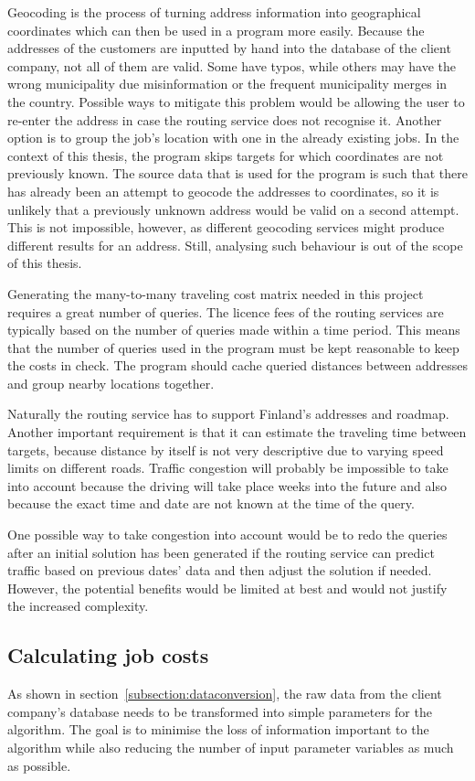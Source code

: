 Geocoding is the process of turning address information into geographical coordinates which can then be used in a program more easily. Because the addresses of the customers are inputted by hand into the database of the client company, not all of them are valid. Some have typos, while others may have the wrong municipality due misinformation or the frequent municipality merges in the country. Possible ways to mitigate this problem would be allowing the user to re-enter the address in case the routing service does not recognise it. Another option is to group the job's location with one in the already existing jobs. In the context of this thesis, the program skips targets for which coordinates are not previously known. The source data that is used for the program is such that there has already been an attempt to geocode the addresses to coordinates, so it is unlikely that a previously unknown address would be valid on a second attempt. This is not impossible, however, as different geocoding services might produce different results for an address. Still, analysing such behaviour is out of the scope of this thesis. 

Generating the many-to-many traveling cost matrix needed in this project requires a great number of queries. The licence fees of the routing services are typically based on the number of queries made within a time period. This means that the number of queries used in the program must be kept reasonable to keep the costs in check. The program should cache queried distances between addresses and group nearby locations together. 

Naturally the routing service has to support Finland's addresses and roadmap. Another important requirement is that it can estimate the traveling time between targets, because distance by itself is not very descriptive due to varying speed limits on different roads. Traffic congestion will probably be impossible to take into account because the driving will take place weeks into the future and also because the exact time and date are not known at the time of the query. 

One possible way to take congestion into account would be to redo the queries after an initial solution has been generated if the routing service can predict traffic based on previous dates' data and then adjust the solution if needed. However, the potential benefits would be limited at best and would not justify the increased complexity.


\subsection{Calculating job costs}
As shown in section~\ref{subsection:dataconversion}, the raw data from the client company's database needs to be transformed into simple parameters for the algorithm. The goal is to minimise the loss of information important to the algorithm while also reducing the number of input parameter variables as much as possible.  

